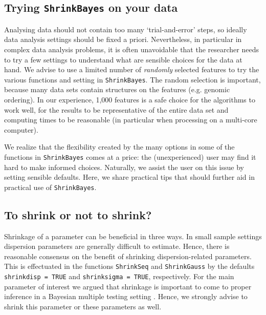 \documentclass[11pt]{article}
\newcommand{\para}{\bigskip\noindent}
\begin{document}
\subsection{Trying {\tt ShrinkBayes} on your data}
Analysing data should not contain too many `trial-and-error' steps, so ideally
data analysis settings should be fixed a priori. Nevertheless, in particular in complex data analysis problems,
it is often unavoidable that the researcher needs to try a few settings to understand what are sensible choices
for the data at hand. We advise to use a limited number of {\it randomly} selected features to try the various
functions and setting in {\tt ShrinkBayes}. The random selection is important, because many data sets contain structures
on the features (e.g. genomic ordering). In our experience, 1,000 features is a safe choice for the algorithms to work well, for
the results to be representative of the entire data set and computing times to be reasonable (in particular when processing on a multi-core
computer).

\para
We realize that the flexibility created by the many options in some of the functions in {\tt ShrinkBayes} comes at a price:
the (unexperienced) user may find it hard to make informed choices. Naturally, we assist the user on this issue by setting sensible
defaults. Here, we share practical tips that should further aid in practical use of {\tt ShrinkBayes}.

\subsection{To shrink or not to shrink?}
Shrinkage of a parameter can be beneficial in three ways.
In small sample settings dispersion parameters are generally difficult to estimate. Hence, there is reasonable consensus
on the benefit of shrinking dispersion-related parameters. This is effectuated in the functions {\tt ShrinkSeq} and {\tt ShrinkGauss} by the defaults
{\tt shrinkdisp = TRUE} and {\tt shrinksigma = TRUE}, respectively. For the main parameter of interest we argued that
shrinkage is important to come to proper inference in a Bayesian multiple testing setting \citep{WielShrinkSeq}. Hence, we strongly advise
to shrink this parameter or these parameters as well.
\end{document}
